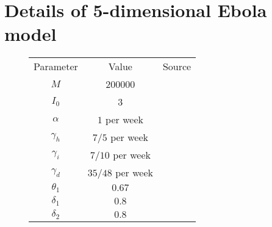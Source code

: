 \section{Details of 5-dimensional Ebola model}\label{app:ebola}
\begin{figure}
	\begin{center}
		\begin{tabular}{|c|c|p{8cm}|}
			\hline
			Parameter       & Value                & Source                                                                                                                                 \\ \hhline{|=|=|=|}
			\(M\)           & 200000               & \citet{DowellEtAl_1999_TransmissionEbolaHemorrhagic}                                                                                   \\ \hline
			\(I_0\)         & 3                    & \citet{KhanEtAl_1999_ReemergenceEbolaHemorrhagic}                                                                                      \\ \hline
			\(\alpha\)      & \(1\) per week       & \citet{DowellEtAl_1999_TransmissionEbolaHemorrhagic,BwakaEtAl_1999_EbolaHemorrhagicFever,NdambiEtAl_1999_EpidemiologicClinicalAspects} \\ \hline
			\(\gamma_h\)    & \(7 / 5\) per week   & \citet{KhanEtAl_1999_ReemergenceEbolaHemorrhagic}                                                                                      \\ \hline
			\(\gamma_i\)    & \(7 / 10\) per week  & \citet{DowellEtAl_1999_TransmissionEbolaHemorrhagic,RoweEtAl_1999_ClinicalVirologicImmunologic}                                        \\ \hline
			\(\gamma_d\)    & \(35 / 48\) per week & \citet{KhanEtAl_1999_ReemergenceEbolaHemorrhagic}                                                                                      \\ \hline
			\(\theta_1\)    & \(0.67\)             & \citet{KhanEtAl_1999_ReemergenceEbolaHemorrhagic}                                                                                      \\ \hline
			\(\delta_1\)    & \(0.8\)              & \citet{KhanEtAl_1999_ReemergenceEbolaHemorrhagic}                                                                                      \\ \hline
			\(\delta_2\)    & \(0.8\)              & \citet{KhanEtAl_1999_ReemergenceEbolaHemorrhagic}                                                                                      \\ \hline

\end{tabular}
\end{center}
\end{figure}
